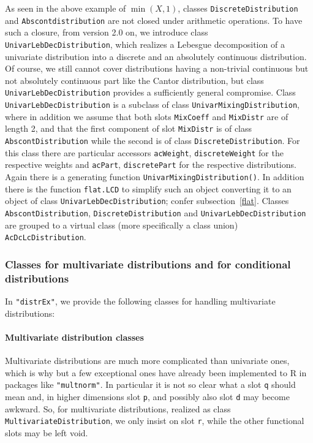 \documentclass[11pt]{article}
\newcommand{\code}[1]{{\tt #1}}
\newcommand{\pkg}[1]{{\tt "#1"}}
\begin{document}
As seen in the above example of $\min(X,1)$, classes \code{DiscreteDistribution}
and \code{Abscontdistribution} are not closed under arithmetic operations. To
have such a closure, from version 2.0 on, we introduce class
\code{UnivarLebDecDistribution}, which realizes a Lebesgue decomposition of a 
univariate distribution into a discrete and an absolutely continuous distribution.
Of course, we still cannot cover distributions having a non-trivial continuous
but not absolutely continuous part like the Cantor distribution, but class 
\code{UnivarLebDecDistribution} provides a sufficiently general compromise.
Class \code{UnivarLebDecDistribution} is a subclass of class 
\code{UnivarMixingDistribution}, where in addition we assume that both slots
\code{MixCoeff} and \code{MixDistr} are of length 2, and that the first component
of slot  \code{MixDistr} is of class \code{AbscontDistribution} while the second
is of class \code{DiscreteDistribution}. For this class there are particular
accessors \code{acWeight}, \code{discreteWeight} for the respective weights and
\code{acPart}, \code{discretePart} for the respective distributions. Again there
is a generating function \code{UnivarMixingDistribution()}.
In addition there is the function \code{flat.LCD}
to simplify such an object converting it to an object of class 
\code{UnivarLebDecDistribution}; confer subsection~\ref{flat}.%
Classes \code{AbscontDistribution}, \code{DiscreteDistribution} and
\code{UnivarLebDecDistribution}  are grouped to a virtual class 
(more specifically a class union)
\code{AcDcLcDistribution}.

\subsubsection{Classes for multivariate distributions and for conditional 
distributions}

In \pkg{distrEx}, we provide the following classes for handling multivariate 
distributions:


\paragraph{Multivariate distribution classes}

Multivariate distributions are much more complicated than univariate ones,
which is why but a few exceptional ones have already been implemented to R in
packages like \pkg{multnorm}. In particular it is not so clear what a slot 
\code{q} should mean and, in higher dimensions slot \code{p}, and possibly also 
slot \code{d} may become awkward. So, for multivariate distributions, realized 
as class \code{MultivariateDistribution}, we only insist on slot \code{r}, while 
the other functional slots may be left void.
\end{document}
